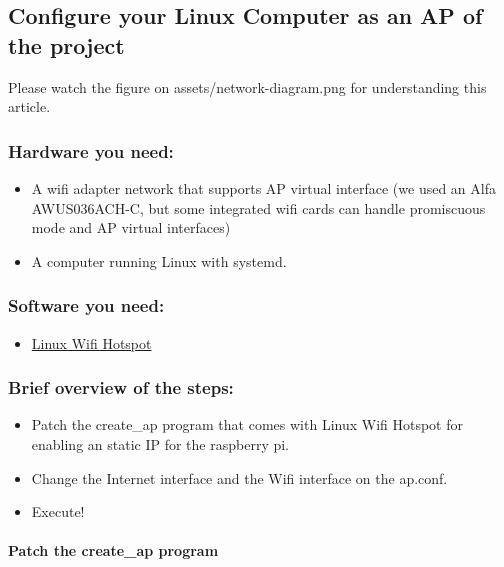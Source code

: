 \subsection{Configure your Linux Computer as an AP of the
project}\label{configure-your-linux-computer-as-an-ap-of-the-project}

Please watch the figure on assets/network-diagram.png for understanding
this article.

\subsubsection{Hardware you need:}\label{hardware-you-need}

\begin{itemize}
\tightlist
\item
  A wifi adapter network that supports AP virtual interface (we used an
  Alfa AWUS036ACH-C, but some integrated wifi cards can handle
  promiscuous mode and AP virtual interfaces)
\item
  A computer running Linux with systemd.
\end{itemize}

\subsubsection{Software you need:}\label{software-you-need}

\begin{itemize}
\tightlist
\item
  \href{https://github.com/lakinduakash/linux-wifi-hotspot}{Linux Wifi
  Hotspot}
\end{itemize}

\subsubsection{Brief overview of the
steps:}\label{brief-overview-of-the-steps}

\begin{itemize}
\tightlist
\item
  Patch the create\_ap program that comes with Linux Wifi Hotspot for
  enabling an static IP for the raspberry pi.
\item
  Change the Internet interface and the Wifi interface on the ap.conf.
\item
  Execute!
\end{itemize}

\paragraph{Patch the create\_ap
program}\label{patch-the-create_ap-program}

